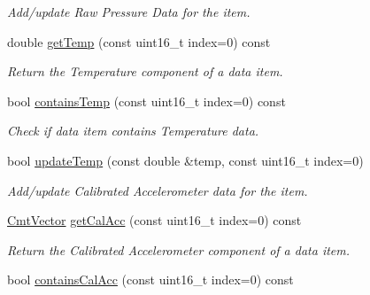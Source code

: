 \begin{DoxyCompactItemize}
\begin{DoxyCompactList}\small\item\em \-Add/update \-Raw \-Pressure \-Data for the item. \end{DoxyCompactList}\item 
double \hyperlink{classxsens_1_1Packet_a2ec0a1315a43edab7694b76278b8d1e3}{get\-Temp} (const uint16\-\_\-t index=0) const 
\begin{DoxyCompactList}\small\item\em \-Return the \-Temperature component of a data item. \end{DoxyCompactList}\item 
\hypertarget{classxsens_1_1Packet_a16acb733d30cf9f92a932e0fc1219375}{bool \hyperlink{classxsens_1_1Packet_a16acb733d30cf9f92a932e0fc1219375}{contains\-Temp} (const uint16\-\_\-t index=0) const }\label{classxsens_1_1Packet_a16acb733d30cf9f92a932e0fc1219375}

\begin{DoxyCompactList}\small\item\em \-Check if data item contains \-Temperature data. \end{DoxyCompactList}\item 
\hypertarget{classxsens_1_1Packet_a441e95779afd91472757a9e0ccef0f66}{bool \hyperlink{classxsens_1_1Packet_a441e95779afd91472757a9e0ccef0f66}{update\-Temp} (const double \&temp, const uint16\-\_\-t index=0)}\label{classxsens_1_1Packet_a441e95779afd91472757a9e0ccef0f66}

\begin{DoxyCompactList}\small\item\em \-Add/update \-Calibrated \-Accelerometer data for the item. \end{DoxyCompactList}\item 
\hyperlink{structCmtVector}{\-Cmt\-Vector} \hyperlink{classxsens_1_1Packet_a25fb9c033df593a7fd237a68f993d14b}{get\-Cal\-Acc} (const uint16\-\_\-t index=0) const 
\begin{DoxyCompactList}\small\item\em \-Return the \-Calibrated \-Accelerometer component of a data item. \end{DoxyCompactList}\item 
\hypertarget{classxsens_1_1Packet_a40be29ceb51b0463ebcff6e8d4fa8a59}{bool \hyperlink{classxsens_1_1Packet_a40be29ceb51b0463ebcff6e8d4fa8a59}{contains\-Cal\-Acc} (const uint16\-\_\-t index=0) const }\label{classxsens_1_1Packet_a40be29ceb51b0463ebcff6e8d4fa8a59}


\end{DoxyCompactItemize}
